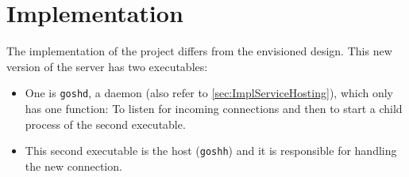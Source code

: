 \documentclass[10pt,a4paper,titlepage,twoside,english,final]{zhawreprt}
\begin{document}
\chapter{Implementation}\label{chp:Implementation}
The implementation of the project differs from the envisioned design.
This new version of the server has two executables:

\begin{itemize}
\item One is \texttt{goshd}, a \gls{daemon} (also refer to \ref{sec:ImplServiceHosting}), which only has one function:
To listen for incoming connections and then to start a child process of the second executable.
\item This second executable is the host (\texttt{goshh}) and it is responsible for handling the new connection.
\end{itemize}
\end{document}
